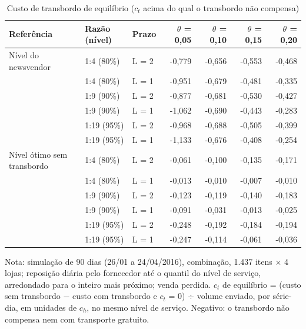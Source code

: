 \begin{table}[htbp]
\centering
\small
\caption{Custo de transbordo de equilíbrio ($c_t$ acima do qual o transbordo não compensa)}
\label{tab:tb_ct_equilibrio}
\begin{tabular}{lllrrrr}
\toprule
Referência & Razão (nível) & Prazo & $\theta$ = 0,05 & $\theta$ = 0,10 & $\theta$ = 0,15 & $\theta$ = 0,20 \\
\midrule
Nível do newsvendor & 1:4 (80\%) & L = 2 & -0,779 & -0,656 & -0,553 & -0,468 \\
 & 1:4 (80\%) & L = 1 & -0,951 & -0,679 & -0,481 & -0,335 \\
 & 1:9 (90\%) & L = 2 & -0,877 & -0,681 & -0,530 & -0,427 \\
 & 1:9 (90\%) & L = 1 & -1,062 & -0,690 & -0,443 & -0,283 \\
 & 1:19 (95\%) & L = 2 & -0,968 & -0,688 & -0,505 & -0,399 \\
 & 1:19 (95\%) & L = 1 & -1,133 & -0,676 & -0,408 & -0,254 \\
\addlinespace
Nível ótimo sem transbordo & 1:4 (80\%) & L = 2 & -0,061 & -0,100 & -0,135 & -0,171 \\
 & 1:4 (80\%) & L = 1 & -0,013 & -0,010 & -0,007 & -0,010 \\
 & 1:9 (90\%) & L = 2 & -0,123 & -0,119 & -0,140 & -0,183 \\
 & 1:9 (90\%) & L = 1 & -0,091 & -0,031 & -0,013 & -0,025 \\
 & 1:19 (95\%) & L = 2 & -0,248 & -0,192 & -0,184 & -0,194 \\
 & 1:19 (95\%) & L = 1 & -0,247 & -0,114 & -0,061 & -0,036 \\
\bottomrule
\end{tabular}
\par\smallskip
{\footnotesize Nota: simulação de 90 dias (26/01 a 24/04/2016), combinação, 1.437 itens × 4 lojas; reposição diária pelo fornecedor até o quantil do nível de serviço, arredondado para o inteiro mais próximo; venda perdida. $c_t$ de equilíbrio = (custo sem transbordo $-$ custo com transbordo e $c_t$ = 0) ÷ volume enviado, por série-dia, em unidades de $c_h$, no mesmo nível de serviço. Negativo: o transbordo não compensa nem com transporte gratuito.}
\end{table}
